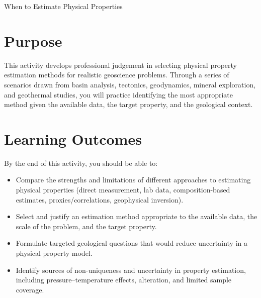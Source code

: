 
\begin{activity}{When to Estimate Physical Properties}

\section*{Purpose}

This activity develops professional judgement in selecting physical property estimation methods for realistic geoscience problems. Through a series of scenarios drawn from basin analysis, tectonics, geodynamics, mineral exploration, and geothermal studies, you will practice identifying the most appropriate method given the available data, the target property, and the geological context.

\section*{Learning Outcomes}

By the end of this activity, you should be able to:
\begin{itemize}
    \item Compare the strengths and limitations of different approaches to estimating physical properties (direct measurement, lab data, composition-based estimates, proxies/correlations, geophysical inversion).
    \item Select and justify an estimation method appropriate to the available data, the scale of the problem, and the target property.
    \item Formulate targeted geological questions that would reduce uncertainty in a physical property model.
    \item Identify sources of non-uniqueness and uncertainty in property estimation, including pressure--temperature effects, alteration, and limited sample coverage.
\end{itemize}

\newcommand{\yourplan}{
    \textbf{Your plan}

    \textbf{2--3 Questions for the Geologist}
    \answerbox[6cm]

    \vspace{0.4em}
    \textbf{Preferred method and why}
    \answerbox[4cm]

    \vspace{0.4em}
    \begin{multicols}{2}
    \noindent\textbf{Pros}
    \begin{itemize}
        \setlength{\itemsep}{0.8em}
        \item \rule{0.88\linewidth}{0.4pt}
        \item \rule{0.88\linewidth}{0.4pt}
    \end{itemize}


\end{multicols}}
\end{activity}
